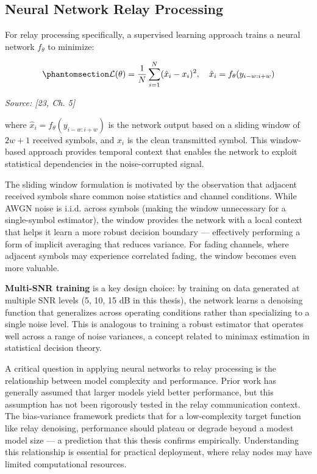 \subsection{Neural Network Relay Processing}\label{sec:neural-network-relay-processing}

For relay processing specifically, a supervised learning approach trains a neural network \(f_\theta\) to minimize:

\begin{equation}\protect\phantomsection\label{eq:mse-loss}{\mathcal{L}(\theta) = \frac{1}{N} \sum_{i=1}^{N} (\hat{x}_i - x_i)^2, \quad \hat{x}_i = f_\theta(y_{i-w:i+w})
}\end{equation} \par{\small\textit{Source: [23, Ch. 5]}}

where \(\hat{x}_i = f_\theta(y_{i-w:i+w})\) is the network output based on a sliding window of \(2w+1\) received symbols, and \(x_i\) is the clean transmitted symbol. This window-based approach provides temporal context that enables the network to exploit statistical dependencies in the noise-corrupted signal.

The sliding window formulation is motivated by the observation that adjacent received symbols share common noise statistics and channel conditions. While AWGN noise is i.i.d. across symbols (making the window unnecessary for a single-symbol estimator), the window provides the network with a local context that helps it learn a more robust decision boundary --- effectively performing a form of implicit averaging that reduces variance. For fading channels, where adjacent symbols may experience correlated fading, the window becomes even more valuable.

\textbf{Multi-SNR training} is a key design choice: by training on data generated at multiple SNR levels (5, 10, 15 dB in this thesis), the network learns a denoising function that generalizes across operating conditions rather than specializing to a single noise level. This is analogous to training a robust estimator that operates well across a range of noise variances, a concept related to minimax estimation in statistical decision theory.

A critical question in applying neural networks to relay processing is the relationship between model complexity and performance. Prior work has generally assumed that larger models yield better performance, but this assumption has not been rigorously tested in the relay communication context. The bias-variance framework predicts that for a low-complexity target function like relay denoising, performance should plateau or degrade beyond a modest model size --- a prediction that this thesis confirms empirically. Understanding this relationship is essential for practical deployment, where relay nodes may have limited computational resources.

